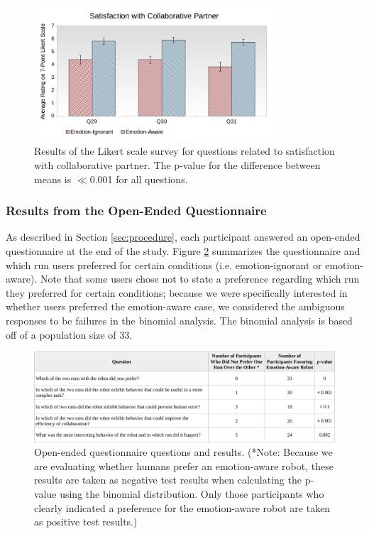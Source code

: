 \documentclass[12pt]{report}
\begin{document}
\begin{figure}
\centering
\includegraphics[width=0.8\textwidth]{figure/Overall-Satisfaction.png}
\caption{Results of the Likert scale survey for questions related to
satisfaction with collaborative partner. The p-value for the difference between
means is $\ll$0.001 for all questions.}
\label{fig:overall-satisfaction}
\end{figure}

\subsubsection{Results from the Open-Ended Questionnaire} 
\label{sec:Open-Ended}
As described in Section \ref{sec:procedure}, each participant answered an open-ended
questionnaire at the end of the study. Figure \ref{fig:Open-Ended-Table}
summarizes the questionnaire and which run users preferred for certain
conditions (i.e. emotion-ignorant or emotion-aware). Note that some users chose
not to state a preference regarding which run they preferred for certain
conditions; because we were specifically interested in whether users preferred
the emotion-aware case, we considered the ambiguous responses to be failures in
the binomial analysis. The binomial analysis is based off of a population size
of 33. 

\begin{figure}[tbh]
\centering
\includegraphics[width=1\textwidth]{figure/table2-croped.pdf}
\caption{Open-ended questionnaire questions and results. (*Note: Because we are
evaluating whether humans prefer an emotion-aware robot, these results are taken
as negative test results when calculating the p-value using the binomial
distribution. Only those participants who clearly indicated a preference for the
emotion-aware robot are taken as positive test results.)}
\label{fig:Open-Ended-Table}
\end{figure}
\end{document}
